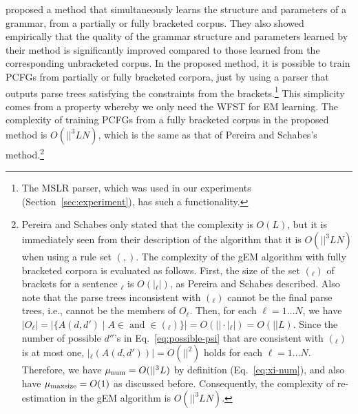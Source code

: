 \documentclass[english]{jnlp_1.4_rep}
\newcommand{\tuple}[1]{}
\newcommand{\Vn}{}
\newcommand{\Vt}{}
\newcommand{\win}{}
\newcommand{\subtrees}{}
\newcommand{\brackets}{}
\newcommand{\Rmax}{}
\begin{document}
 proposed a method that simultaneously
learns the structure and parameters of a grammar,
from a partially or fully bracketed corpus.
They also showed empirically that the quality of the grammar structure
and parameters learned by their method is significantly
improved compared to those learned from the corresponding
unbracketed corpus.  In the proposed method, it is possible
to train PCFGs from partially or fully bracketed corpora,
just by using a parser that outputs parse trees satisfying
the constraints from the brackets.\footnote{
The MSLR parser, which was used in our experiments (Section~\ref{sec:experiment}),
has such a functionality.
} 
This simplicity comes from a property whereby we only need the WFST
for EM learning.  The complexity of training PCFGs from
a fully bracketed corpus in the proposed method is $O(|\Vn|^3 L N)$,
which is the same as that of Pereira and Schabes's method.\footnote{
Pereira and Schabes only stated that the complexity is $O(L)$,
but it is immediately seen from their description of the algorithm
that it is $O(|\Vn|^3 L N)$ when using a rule set $\Rmax(\Vn,\Vt)$.
The complexity of the gEM algorithm with fully bracketed corpora
is evaluated as follows.
First, the size of the set $\brackets(\win_\ell)$ of brackets for
a sentence $\win_\ell$ is $O(|\win_\ell|)$, as Pereira and Schabes described.
Also note that the parse trees inconsistent with $\brackets(\win_\ell)$
cannot be the final parse trees, i.e., cannot be the members of $O_\ell$.
Then, for each $\ell=1\ldots N$, we have
$|O_\ell|=
	\left|\{A(d,d')\mid
			A\in\Vn\;\mbox{and}\;\tuple{d,d'}\in\brackets(\win_\ell)\}\right|
	=O(|\Vn|\cdot|\win_\ell|)=O(|\Vn|L)$.
Since the number of possible $d''$'s in Eq.~\ref{eq:possible-psi}
that are consistent with $\brackets(\win_\ell)$ is at most one,
$|\subtrees_\ell(A(d,d'))|=O(|\Vn|^2)$ holds for each $\ell=1\ldots N$.
Therefore, we have $\mu_{\rm num}=O(|\Vn|^3L)$ by definition
(Eq.~\ref{eq:xi-num}),
and also have $\mu_{\rm maxsize}=O(1)$ as discussed before.
Consequently, the complexity of re-estimation
in the gEM algorithm is $O(|\Vn|^3LN)$.
} 
\end{document}
